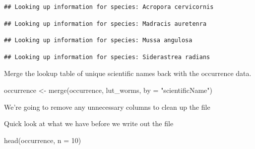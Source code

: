 \documentclass[
]{book}
\newenvironment{Shaded}{\begin{snugshade}}{\end{snugshade}}
\newcommand{\AttributeTok}[1]{\textcolor[rgb]{0.77,0.63,0.00}{#1}}
\newcommand{\ConstantTok}[1]{\textcolor[rgb]{0.00,0.00,0.00}{#1}}
\newcommand{\DecValTok}[1]{\textcolor[rgb]{0.00,0.00,0.81}{#1}}
\newcommand{\FunctionTok}[1]{\textcolor[rgb]{0.00,0.00,0.00}{#1}}
\newcommand{\NormalTok}[1]{#1}
\newcommand{\OtherTok}[1]{\textcolor[rgb]{0.56,0.35,0.01}{#1}}
\newcommand{\SpecialCharTok}[1]{\textcolor[rgb]{0.00,0.00,0.00}{#1}}
\newcommand{\StringTok}[1]{\textcolor[rgb]{0.31,0.60,0.02}{#1}}
\begin{document}
\begin{verbatim}
## Looking up information for species: Acropora cervicornis
\end{verbatim}

\begin{verbatim}
## Looking up information for species: Madracis auretenra
\end{verbatim}

\begin{verbatim}
## Looking up information for species: Mussa angulosa
\end{verbatim}

\begin{verbatim}
## Looking up information for species: Siderastrea radians
\end{verbatim}

Merge the lookup table of unique scientific names back with the occurrence data.

\begin{Shaded}
\begin{Highlighting}[]
\NormalTok{occurrence }\OtherTok{\textless{}{-}} \FunctionTok{merge}\NormalTok{(occurrence, lut\_worms, }\AttributeTok{by =} \StringTok{"scientificName"}\NormalTok{)}
\end{Highlighting}
\end{Shaded}

We're going to remove any unnecessary columns to clean up the file

\begin{Shaded}
\end{Shaded}

Quick look at what we have before we write out the file

\begin{Shaded}
\begin{Highlighting}[]
\FunctionTok{head}\NormalTok{(occurrence, }\AttributeTok{n =} \DecValTok{10}\NormalTok{)}
\end{Highlighting}
\end{Shaded}
\end{document}
